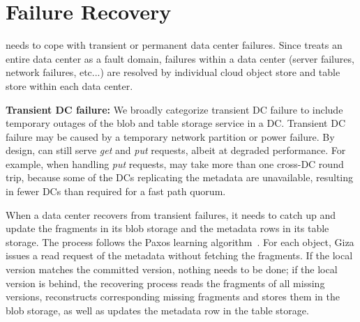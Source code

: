 \section{Failure Recovery}


\name needs to cope with transient or permanent data center failures. Since
\name treats an entire data center as a fault domain, failures within a data
center (server failures, network failures, etc...) are resolved by individual
cloud object store and table store within each data center.

{\bf Transient DC failure:}
We broadly categorize transient DC failure to include temporary outages of the blob
and table storage service in a DC. 
Transient DC failure may be caused by a temporary network partition or power failure.
By design, {\name} can still serve {\em get} and {\em put} requests, albeit at degraded performance. 
For example, when handling {\em put} requests,
\name may take more than one cross-DC round trip,
because some of the DCs replicating the metadata are unavailable,
resulting in fewer DCs than required for a fast path quorum.

When a data center recovers from transient failures,
it needs to catch up and update the fragments in its blob storage
and the metadata rows in its table storage. 
The process follows the Paxos learning algorithm~\cite{lamport01paxos}.
For each object, Giza issues a read request of the metadata without fetching the fragments.
If the local version matches the committed version, nothing needs to be done;
if the local version is behind,
the recovering process reads the fragments of all missing versions,
reconstructs corresponding missing fragments and stores them in the blob storage,
as well as updates the metadata row in the table storage.

